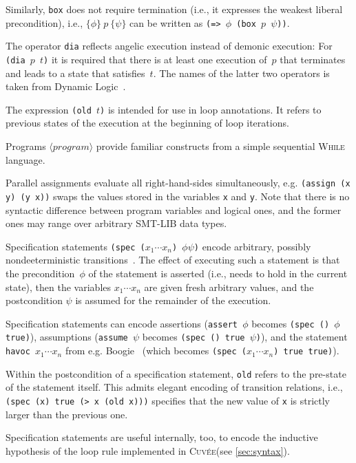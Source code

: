 \documentclass[fleqn]{llncs}
\newcommand{\Cuvee}{\textsc{Cuvée}\xspace}
\newcommand{\code}[1]{\texttt{#1}}
\newcommand{\hoare}[3]{\{ #1 \}~#2~\{ #3 \}}
\newcommand{\nonterminal}[1]{\ensuremath{\langle \mathit{#1} \rangle}}
\begin{document}
Similarly, \code{box} does not require termination (i.e., it expresses the weakest liberal precondition),
i.e., $\hoare{\phi}{p}{\psi}$ can be written as \code{(=> $\phi$ (box $p$ $\psi$))}.

The operator \code{dia} reflects angelic execution instead of demonic execution:
For \code{(dia $p$ $t$)} it is required that there is at least one execution of~$p$
that terminates and leads to a state that satisfies~$t$.
The names of the latter two operators is taken from Dynamic Logic~\cite{}.

The expression \code{(old $t$)} is intended for use in loop annotations.
It refers to previous states of the execution at the beginning of loop iterations.

\medskip

Programs \nonterminal{program} provide familiar constructs from a simple sequential \textsc{While} language.

Parallel assignments evaluate all right-hand-sides simultaneously,
e.g. \code{(assign (x y)  (y x))} swaps the values stored in the variables \code{x} and \code{y}.
Note that there is no syntactic difference between program variables and logical ones,
and the former ones may range over arbitrary SMT-LIB data types.

Specification statements \code{(spec ($x_1 \cdots x_n$) $\phi \psi$)}
encode arbitrary, possibly nondeeterministic transitions~\cite{}.
The effect of executing such a statement is that the precondition~$\phi$ of the statement
is asserted (i.e., needs to hold in the current state),
then the variables \code{$x_1 \cdots x_n$} are given fresh arbitrary values,
and the postcondition $\psi$ is assumed for the remainder of the execution.

Specification statements can encode assertions (\code{assert $\phi$} becomes \code{(spec () $\phi$ true)}),
assumptions (\code{assume $\psi$} becomes \code{(spec () true $\psi$)}),
and the statement \code{havoc $x_1 \cdots x_n$} from e.g. Boogie~\cite{}
(which becomes \code{(spec ($x_1 \cdots x_n$) true true)}).

Within the postcondition of a specification statement, \code{old} refers to the pre-state of the statement itself.
This admits elegant encoding of transition relations,
i.e., \code{(spec (x) true (> x (old x)))} specifies that the new value of \code{x} is strictly larger than the previous one.

Specification statements are useful internally, too, to encode the inductive hypothesis of the loop rule implemented in \Cuvee (see \cref{sec:syntax}).
\end{document}
